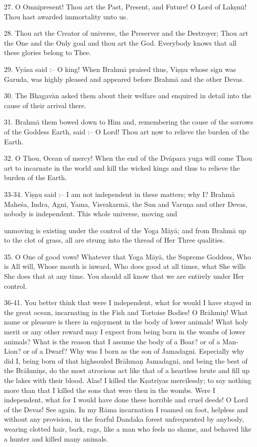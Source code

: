 27. O Omnipresent! Thou art the Past, Present, and Future! O Lord of Lak\d{s}m\={\i}! Thou hast awarded immortality unto us.

28. Thou art the Creator of universe, the Preserver and the Destroyer; Thou art the One and the Only goal and thou art the God. Everybody knows that all these glories belong to Thee.

29. Vy\=asa said :-- O king! When Brahm\=a praised thus, Vi\d{s}\d{n}u whose sign was Garuda, was highly pleased and appeared before Brahm\=a and the other Devas.

30. The Bhagav\=an asked them about their welfare and enquired in detail into the cause of their arrival there.

31. Brahm\=a them bowed down to Him and, remembering the cause of the sorrows of the Goddess Earth, said :-- O Lord! Thou art now to relieve the burden of the Earth.

32. O Thou, Ocean of mercy! When the end of the Dv\=apara yuga will come Thou art to incarnate in the world and kill the wicked kings and thus to relieve the burden of the Earth.

33-34. Vi\d{s}\d{n}u said :-- I am not independent in these matters; why I? Brahm\=a Mahe\'sa, Indra, Agni, Yama, Visvakarm\=a, the Sun and Varu\d{n}a and other Devas, nobody is independent. This whole universe, moving and

unmoving is existing under the control of the Yoga M\=ay\=a; and from Brahm\=a up to the clot of grass, all are strung into the thread of Her Three qualities.

35. O One of good vows! Whatever that Yoga M\=ay\=a, the Supreme Goddess, Who is All will, Whose mouth is inward, Who does good at all times, what She wills She does that at any time. You should all know that we are entirely under Her control.

36-41. You better think that were I independent, what for would I have stayed in the great ocean, incarnating in the Fish and Tortoise Bodies! O Br\=ahmi\d{n}! What name or pleasure is there in enjoyment in the body of lower animals! What holy merit or any other reward may I expect from being born in the wombs of lower animals? What is the reason that I assume the body of a Boar? or of a Man-Lion? or of a Dwarf? Why was I born as the son of Jamadagni. Especially why did I, being born of that highsouled Br\=ahma\d{n} Jamadagni, and being the best of the Br\=ahmi\d{n}s, do the most atrocious act like that of a heartless brute and fill up the lakes with their blood. Alas! I killed the K\d{s}atriyas mercilessly; to say nothing more than that I killed the sons that were then in the wombs. Were I independent, what for I would have done these horrible and cruel deeds! O Lord of the Devas! See again. In my R\=ama incarnation I roamed on foot, helpless and without any provision, in the fearful Dandaka forest unfrequented by anybody, wearing clotted hair, bark, rags, like a man who feels no shame, and behaved like a hunter and killed many animals.

